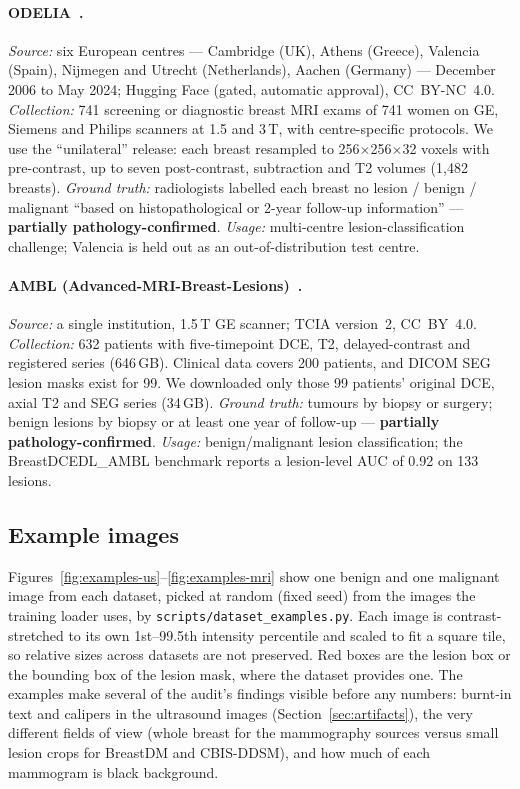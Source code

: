 \documentclass[11pt]{article}
\begin{document}
\paragraph{ODELIA~\citep{mullerfranzes2025odelia}.}
\emph{Source:} six European centres --- Cambridge (UK), Athens (Greece),
Valencia (Spain), Nijmegen and Utrecht (Netherlands), Aachen (Germany) ---
December 2006 to May 2024; Hugging Face (gated, automatic approval),
CC~BY-NC~4.0. \emph{Collection:} 741 screening or diagnostic breast MRI exams of
741 women on GE, Siemens and Philips scanners at 1.5 and 3\,T, with
centre-specific protocols. We use the ``unilateral'' release: each breast
resampled to 256$\times$256$\times$32 voxels with pre-contrast, up to seven
post-contrast, subtraction and T2 volumes (1,482 breasts). \emph{Ground
truth:} radiologists labelled each breast no lesion / benign / malignant ``based
on histopathological or 2-year follow-up information'' ---
\textbf{partially pathology-confirmed}. \emph{Usage:} multi-centre
lesion-classification challenge; Valencia is held out as an
out-of-distribution test centre.

\paragraph{AMBL (Advanced-MRI-Breast-Lesions)~\citep{daniels2024ambl}.}
\emph{Source:} a single institution, 1.5\,T GE scanner; TCIA version~2,
CC~BY~4.0. \emph{Collection:} 632 patients with five-timepoint DCE, T2,
delayed-contrast and registered series (646\,GB). Clinical data covers 200
patients, and DICOM SEG lesion masks exist for 99. We downloaded only those
99 patients' original DCE, axial T2 and SEG series (34\,GB).
\emph{Ground truth:} tumours by biopsy or surgery; benign lesions by biopsy or
at least one year of follow-up --- \textbf{partially pathology-confirmed}.
\emph{Usage:} benign/malignant lesion classification; the BreastDCEDL\_AMBL
benchmark reports a lesion-level AUC of 0.92 on 133 lesions.

\subsection{Example images}
\label{sec:examples}

Figures~\ref{fig:examples-us}--\ref{fig:examples-mri} show one benign and
one malignant image from each dataset, picked at random (fixed seed) from
the images the training loader uses, by
\texttt{scripts/dataset\_examples.py}. Each image is contrast-stretched to
its own 1st--99.5th intensity percentile and scaled to fit a square tile,
so relative sizes across datasets are not preserved. Red boxes are the
lesion box or the bounding box of the lesion mask, where the dataset
provides one. The examples make several of the audit's findings visible
before any numbers: burnt-in text and calipers in the ultrasound images
(Section~\ref{sec:artifacts}), the very different fields of view (whole
breast for the mammography sources versus small lesion crops for BreastDM
and CBIS-DDSM), and how much of each mammogram is black background.
\end{document}
